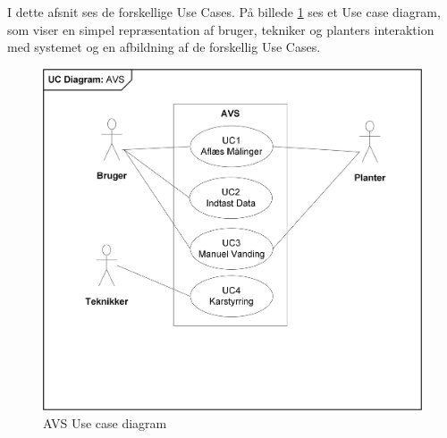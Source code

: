I dette afsnit ses de forskellige Use Cases. På billede \ref{photo:UseCD} ses et Use case diagram, som viser en simpel repræsentation af bruger, tekniker og planters interaktion med systemet og en afbildning af de forskellig Use Cases. 

\begin{figure}[H]
	\centering
	\includegraphics[scale=1]{Kravspecifikation/UseCases/Photo/AVS_UseCases}
	\caption{AVS Use case diagram}
	\label{photo:UseCD}
\end{figure}

\newpage